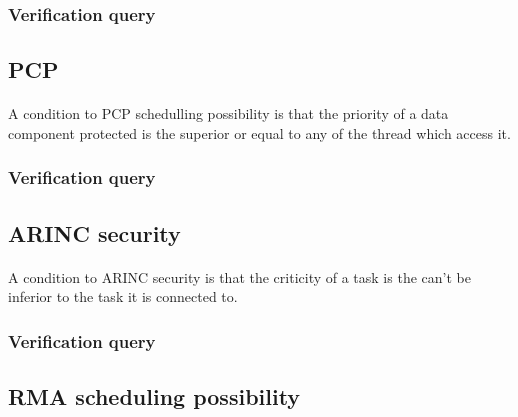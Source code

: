 \subsubsection {Verification query}
\paragraph{}


\subsection {PCP}

\paragraph{}
A condition to PCP schedulling possibility is that the priority 
of a data component protected is the superior or equal to any 
of the thread which access it.

\subsubsection {Verification query}
\paragraph{}


\subsection {ARINC security}

\paragraph{}
A condition to ARINC security is that the criticity
of a task is the can't be inferior to the task it is 
connected to.

\subsubsection {Verification query}
\paragraph{}


\subsection {RMA scheduling possibility}

